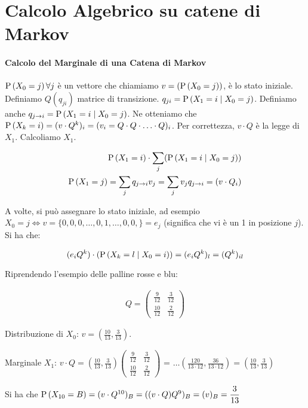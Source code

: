 \section{Calcolo Algebrico su catene di Markov}

\paragraph{Calcolo del Marginale di una Catena di Markov}
$ \text{P}\left(X_0 = j\right) \forall j $ \`e un vettore che chiamiamo $ v = (\text{P}\left(X_0 = j\right)) $, \`e lo stato iniziale. Definiamo $ Q(q_{ji}) $ matrice di transizione. $ q_{ji} = \text{P}\left(X_1 = i \mid X_0 = j\right) $. Definiamo anche $ q_{j \to i} = \text{P}\left(X_1 = i \mid X_0 = j\right) $. Ne otteniamo che $ \text{P}\left(X_k = i\right) = (v \cdot Q^k)_i = (v_i = Q \cdot Q \cdot \hdots \cdot Q)_i $. Per correttezza, $ v \cdot Q $ \`e la legge di $ X_1 $. Calcoliamo $ X_1 $.

\begin{equation*}
	\begin{aligned}
	\text{P}\left(X_1 = i\right) \cdot \sum_j (\text{P}\left(X_1 = i \mid X_0 = j\right)) \\
	\text{P}\left(X_1 = j\right) = \sum_j q_{j \to i} v_j = \sum_j v_j q_{j \to i} = (v \cdot Q_i)
	\end{aligned}
\end{equation*}


A volte, si pu\`o assegnare lo stato iniziale, ad esempio $ X_0 = j \iff v = \{0, 0, 0, \hdots, 0, 1, \hdots, 0, 0,\} = e_j $ (significa che vi \`e un 1 in posizione $ j $). Si ha che:

\begin{equation*}
(e_i Q^k) \cdot (\text{P}\left(X_k = l \mid X_0 = i\right) ) = (e_i Q^k)_l = (Q^k)_{il}
\end{equation*}

\begin{exmp}
	Riprendendo l'esempio delle palline rosse e blu:
	
	\begin{equation*}
	\begin{aligned}
	Q=\begin{pmatrix}
	\frac{9}{12} & \frac{3}{12} \\
	\frac{10}{12} & \frac{2}{12}
	\end{pmatrix}
	\end{aligned}
	\end{equation*}
	
	Distribuzione di $ X_0 $: $ v = (\frac{10}{13}, \frac{3}{13}) $.
	
	Marginale $ X_1 $: $ v \cdot Q = (\frac{10}{13}, \frac{3}{13})\begin{pmatrix}
	\frac{9}{12} & \frac{3}{12} \\
	\frac{10}{12} & \frac{2}{12}
	\end{pmatrix} $ = $\hdots (\frac{120}{13 \cdot 12}, \frac{36}{13 \cdot 12}) = \left( \frac{10}{13}, \frac{3}{13} \right)$
	
	Si ha che $ \text{P}\left(X_{10} = B\right) = (v \cdot Q^{10})_B = ((v \cdot Q) Q^9)_B = (v)_B = {\dfrac{3}{13}} $
	
\end{exmp}

